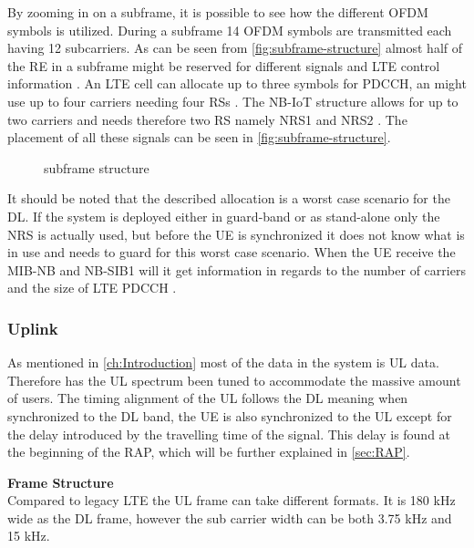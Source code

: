 By zooming in on a subframe, it is possible to see how the different \gls{OFDM} symbols is utilized. During a subframe 14 \gls{OFDM} symbols are transmitted each having 12 subcarriers. As can be seen from \autoref{fig:subframe-structure} almost half of the \gls{RE} in a subframe might be reserved for different signals and \gls{LTE} control information \citep{REL-13}. An \gls{LTE} cell can allocate up to three symbols for \gls{PDCCH}, an might use up to four carriers needing four \gls{RS}s \citep{whitepaper}. The \gls{NB-IoT} structure allows for up to two carriers and needs therefore two \gls{RS} namely \gls{NRS}1 and \gls{NRS}2 \citep{REL-13}. The placement of all these signals can be seen in \autoref{fig:subframe-structure}.  

\begin{figure}[H]
\centering

\caption{subframe structure \citep{whitepaper,REL-13}}
\label{fig:subframe-structure}
\end{figure}

It should be noted that the described allocation is a worst case scenario for the \gls{DL}. If the system is deployed either in guard-band or as stand-alone only the \gls{NRS} is actually used, but before the \gls{UE} is synchronized it does not know what is in use and needs to guard for this worst case scenario. When the \gls{UE} receive the \gls{MIB-NB} and \gls{NB-SIB}1 will it get information in regards to the number of carriers and the size of \gls{LTE} \gls{PDCCH} \citep{whitepaper}. 




\subsubsection{Uplink}
As mentioned in \autoref{ch:Introduction} most of the data in the system is \gls{UL} data. Therefore has the \gls{UL} spectrum been tuned to accommodate the massive amount of users. The timing alignment of the \gls{UL} follows the \gls{DL} meaning when synchronized to the \gls{DL} band, the \gls{UE} is also synchronized to the \gls{UL} except for the delay introduced by the travelling time of the signal. This delay is found at the beginning of the \gls{RAP}, which will be further explained in \autoref{sec:RAP}.

\textbf{Frame Structure}\\
Compared to legacy \gls{LTE} the \gls{UL} frame can take different formats. It is 180 kHz wide as the \gls{DL} frame, however the sub carrier width can be both 3.75 kHz and 15 kHz.


